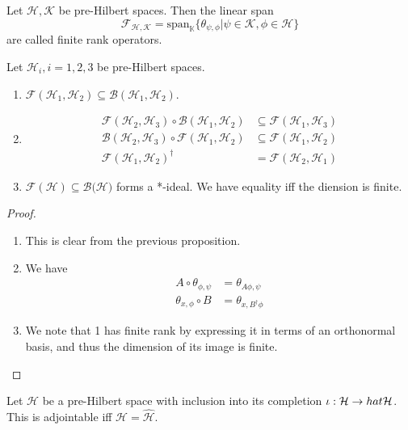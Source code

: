 \documentclass[twoside,symmetric, openany, 12pt]{./tuftebook}
\theoremstyle{definition}
\theoremstyle{definition}
\theoremstyle{definition}
\newenvironment{parts}{\begin{enumerate}[label=(\alph*)]}{\end{enumerate}}
\begin{document}
\begin{Definition}
	Let $\mathcal{H}, \mathcal{K}$ be pre-Hilbert spaces. Then the linear span
	\[
		\mathcal{F}_{\mathcal{H}, \mathcal{K}} = \text{span}_\mathbb{K}\{\theta_{\psi, \phi}|\psi\in \mathcal{K}, \phi\in \mathcal{H}\} 
	\]
	are called finite rank operators.
\end{Definition}
\begin{Proposition}
	Let $\mathcal{H}_i, i=1,2,3$ be pre-Hilbert spaces. 
	\begin{parts}
	\item $\mathcal{F}(\mathcal{H}_1, \mathcal{H}_2)\subseteq \mathcal{B}(\mathcal{H}_1, \mathcal{H}_2)$.
	\item 
		\begin{align*}
			\mathcal{F}(\mathcal{H}_2, \mathcal{H}_3) \circ \mathcal{B}(\mathcal{H}_1, \mathcal{H}_2)&\subseteq \mathcal{F}(\mathcal{H}_1, \mathcal{H}_3)\\
			\mathcal{B}(\mathcal{H}_2, \mathcal{H}_3) \circ \mathcal{F}(\mathcal{H}_1, \mathcal{H}_2)&\subseteq \mathcal{F}(\mathcal{H}_1, \mathcal{H}_2)\\
			\mathcal{F}(\mathcal{H}_1, \mathcal{H}_2)^\dagger &= \mathcal{F}(\mathcal{H}_2, \mathcal{H}_1)
		\end{align*}
	\item $\mathcal{F}(\mathcal{H})\subseteq  \mathcal{B}(\mathcal{H)}$ forms a *-ideal. We have equality iff the diension is finite.
	\end{parts}
\end{Proposition}
\begin{proof}
	\begin{parts}
	\item This is clear from the previous proposition.
	\item We have
		\begin{align*}
			A\circ \theta_{\phi, \psi}&=\theta_{A\phi, \psi}\\
			\theta_{x, \phi}\circ B&=\theta_{x, B^\dagger \phi}
		\end{align*}
	\item We note that 1 has finite rank by expressing it in terms of an orthonormal basis, and thus the dimension of its image is finite.\qedhere
	\end{parts}
\end{proof}
\begin{Example}
Let $\mathcal{H}$ be a pre-Hilbert space with inclusion into its completion $\iota:\mathcal{H}\to \\hat{\mathcal{H}}$. This is adjointable iff $\mathcal{H}=\hat{\mathcal{H}}$.
\end{Example}
\end{document}
